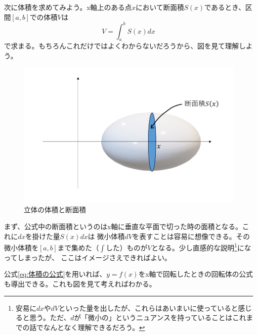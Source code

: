 \documentclass[a4j,dvipdfmx]{jsarticle}
\begin{document}
                次に体積を求めてみよう。x軸上のある点$x$において断面積$S(x)$であるとき、区間$[a,b]$での体積$V$は
                \begin{equation}
                    V=\int_a^b S(x)dx \label{eq:体積の公式}
                \end{equation}
                で求まる。もちろんこれだけではよくわからないだろうから、図を見て理解しよう。
                \begin{figure}[h]
                    \centering
                    \includegraphics[scale=0.3]{img/QuuNote/Sx_V.png}
                    \caption{立体の体積と断面積}
                \end{figure}

                まず、公式中の断面積というのはx軸に垂直な平面で切った時の面積となる。これに$dx$を掛けた量$S(x)dx$は
                微小体積$dV$を表すことは容易に想像できる。その微小体積を$[a,b]$まで集めた（$\int$した）ものが$V$となる。少し直感的な説明\footnote{安易に$dx$や$dV$といった量を出したが、これらはあいまいに使っていると感じると思う。ただ、$d$が「微小の」というニュアンスを持っていることはこれまでの話でなんとなく理解できるだろう。}になってしまったが、
                ここはイメージさえできればよい。

                公式\eqref{eq:体積の公式}を用いれば、$y=f(x)$をx軸で回転したときの回転体の公式も導出できる。これも図を見て考えればわかる。
\end{document}
